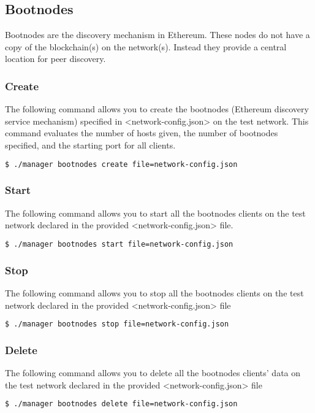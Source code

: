 \subsection{Bootnodes}

Bootnodes are the discovery mechanism in Ethereum. These nodes do not have a copy of the blockchain(s) on the network(s). Instead they provide a central location for peer discovery. 

\subsubsection{Create}
The following command allows you to create the bootnodes (Ethereum discovery service mechanism) specified in <network-config.json> on the test network. This command evaluates the number of hosts given, the number of bootnodes specified, and the starting port for all clients. 
\begin{lstlisting}[language=bash]
$ ./manager bootnodes create file=network-config.json
\end{lstlisting}

\subsubsection{Start}
The following command allows you to start all the bootnodes clients on the test network declared in the provided <network-config.json> file.
\begin{lstlisting}[language=bash]
$ ./manager bootnodes start file=network-config.json
\end{lstlisting}

\subsubsection{Stop}
The following command allows you to stop all the bootnodes clients on the test network declared in the provided <network-config.json> file
\begin{lstlisting}[language=bash]
$ ./manager bootnodes stop file=network-config.json
\end{lstlisting}

\subsubsection{Delete}
The following command allows you to delete all the bootnodes clients' data on the test network declared in the provided <network-config.json> file
\begin{lstlisting}[language=bash]
$ ./manager bootnodes delete file=network-config.json
\end{lstlisting}